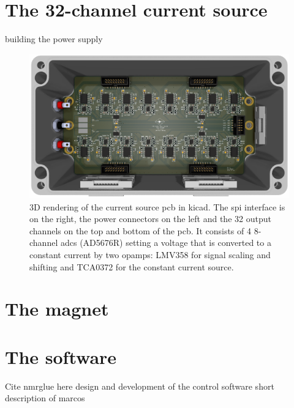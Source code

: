\section{The 32-channel current source}
building the power supply
\begin{figure}[hbt]
    \centering
    \includegraphics{images/32-channel_current_source.png}
    \caption{ 3D rendering of the current source \acrshort{pcb} in \gls{kicad}. The \acrshort{spi} interface is on the right, the power connectors on the left and the 32 output channels on the top and bottom of the \acrshort{pcb}. It consists of 4 8-channel \acrshort{adc}s (AD5676R) setting a voltage that is converted to a constant current by two \acrshort{opamp}s: LMV358 for signal scaling and shifting and TCA0372 for the constant current source.}
\end{figure}

\section{The magnet}

\section{The software}

Cite nmrglue here 
design and development of the control software
short description of marcos


